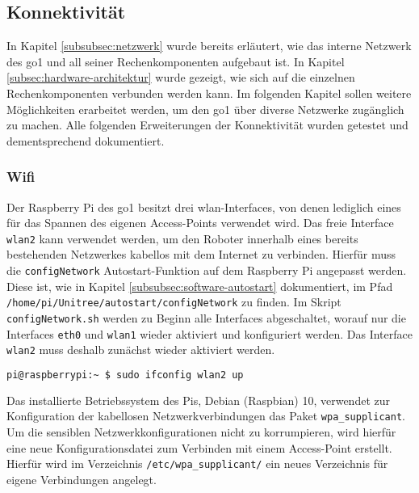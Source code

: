\subsection{Konnektivität}
\label{subsec:konnektivitat}

In Kapitel \ref{subsubsec:netzwerk} wurde bereits erläutert, wie das interne Netzwerk des \gls{go1} und all seiner
Rechenkomponenten aufgebaut ist.
In Kapitel \ref{subsec:hardware-architektur} wurde gezeigt, wie sich auf die einzelnen Rechenkomponenten verbunden werden kann.
Im folgenden Kapitel sollen weitere Möglichkeiten erarbeitet werden, um den \gls{go1} über diverse Netzwerke zugänglich zu machen.
Alle folgenden Erweiterungen der Konnektivität wurden getestet und dementsprechend dokumentiert.

\subsubsection{Wifi}
\label{subsubsec:wifi}

Der Raspberry Pi des \gls{go1} besitzt drei \gls{wlan}-Interfaces, von denen lediglich eines für das Spannen des eigenen
Access-Points verwendet wird.
Das freie Interface \texttt{wlan2} kann verwendet werden, um den Roboter innerhalb eines bereits bestehenden Netzwerkes kabellos
mit dem Internet zu verbinden.
Hierfür muss die \texttt{configNetwork} Autostart-Funktion auf dem Raspberry Pi angepasst werden.
Diese ist, wie in Kapitel \ref{subsubsec:software-autostart} dokumentiert, im Pfad
\texttt{/home/\allowbreak pi/\allowbreak Unitree/\allowbreak autostart/\allowbreak configNetwork} zu finden.
Im Skript \texttt{configNetwork.sh} werden zu Beginn alle Interfaces abgeschaltet, worauf nur die Interfaces \texttt{eth0}
und \texttt{wlan1} wieder aktiviert und konfiguriert werden.
Das Interface \texttt{wlan2} muss deshalb zunächst wieder aktiviert werden.

\begin{lstlisting}[language=Bash]
pi@raspberrypi:~ $ sudo ifconfig wlan2 up
\end{lstlisting}


Das installierte Betriebssystem des Pis, Debian (Raspbian) \num{10}, verwendet zur Konfiguration der kabellosen Netzwerkverbindungen
das Paket \texttt{wpa\_supplicant}.
Um die sensiblen Netzwerkkonfigurationen nicht zu korrumpieren, wird hierfür eine neue Konfigurationsdatei zum Verbinden
mit einem Access-Point erstellt.
Hierfür wird im Verzeichnis \texttt{/etc/wpa\_supplicant/} ein neues Verzeichnis für eigene Verbindungen angelegt.

